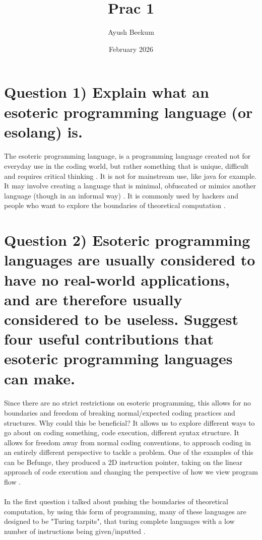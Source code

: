 \documentclass{article}
\title{Prac 1}
\author{Ayush Beekum}
\date{February 2026}
\begin{document}
\maketitle

\section{Question 1) Explain what an esoteric programming language (or esolang) is.}

\paragraph{}The esoteric programming language, is a programming language created not for everyday use in the coding world, but rather something that is unique, difficult and requires critical thinking \cite{esolang-wiki}. It is not for mainstream use, like java for example. It may involve creating a language that is minimal, obfuscated or mimics another language (though in an informal way) \cite{esolang-ipfs}. It is commonly used by hackers and people who want to explore the boundaries of theoretical computation \cite{esolang-archive}.

\section{Question 2) Esoteric programming languages are usually considered to have no real-world applications, and are therefore usually considered to be useless. Suggest four useful contributions that esoteric programming languages can make.}

\paragraph{}Since there are no strict restrictions on esoteric programming, this allows for no boundaries and freedom of breaking normal/expected coding practices and structures. Why could this be beneficial? It allows us to explore different ways to go about on coding something, code execution, different syntax structure. It allows for freedom away from normal coding conventions, to approach coding in an entirely different perspective to tackle a problem. One of the examples of this can be Befunge, they produced a 2D instruction pointer, taking on the linear approach of code execution and changing the perspective of how we view program flow \cite{esolang-archive}.

\paragraph{}In the first question i talked about pushing the boundaries of theoretical computation, by using this form of programming, many of these languages are designed to be "Turing tarpits", that turing complete languages with a low number of instructions being given/inputted \cite{esolang-wiki}.
\end{document}

